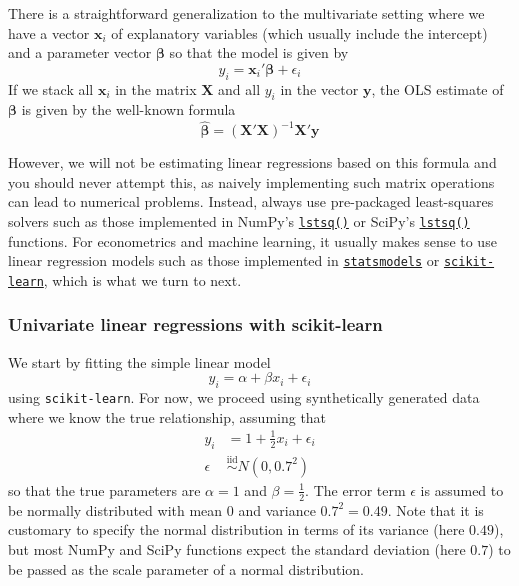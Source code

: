 \documentclass{scrartcl}
\begin{document}
There is a straightforward generalization to the multivariate setting
where we have a vector \(\mathbf{x}_i\) of explanatory variables (which
usually include the intercept) and a parameter vector \(\bm\beta\) so
that the model is given by \[
y_i = \mathbf{x}_i'\bm\beta + \epsilon_i
\] If we stack all \(\mathbf{x}_i\) in the matrix \(\mathbf{X}\) and all
\(y_i\) in the vector \(\mathbf{y}\), the OLS estimate of \(\bm\beta\)
is given by the well-known formula \[
\widehat{\bm\beta} = \left(\mathbf{X}'\mathbf{X}\right)^{-1} \mathbf{X}'\mathbf{y}
\]

However, we will not be estimating linear regressions based on this
formula and you should never attempt this, as naively implementing such
matrix operations can lead to numerical problems. Instead, always use
pre-packaged least-squares solvers such as those implemented in NumPy's
\href{https://numpy.org/doc/stable/reference/generated/numpy.linalg.lstsq.html}{\texttt{lstsq()}}
or SciPy's
\href{https://docs.scipy.org/doc/scipy/reference/generated/scipy.linalg.lstsq.html}{\texttt{lstsq()}}
functions. For econometrics and machine learning, it usually makes sense
to use linear regression models such as those implemented in
\href{https://www.statsmodels.org/stable/regression.html}{\texttt{statsmodels}}
or
\href{https://scikit-learn.org/stable/modules/generated/sklearn.linear_model.LinearRegression.html}{\texttt{scikit-learn}},
which is what we turn to next.

    \hypertarget{univariate-linear-regressions-with-scikit-learn}{%
\subsubsection{Univariate linear regressions with
scikit-learn}\label{univariate-linear-regressions-with-scikit-learn}}

We start by fitting the simple linear model \[
y_i = \alpha + \beta x_i + \epsilon_i
\] using \texttt{scikit-learn}. For now, we proceed using synthetically
generated data where we know the true relationship, assuming that \[
\begin{aligned}
y_i &= 1 + \frac{1}{2} x_i + \epsilon_i \\
\epsilon &\stackrel{\text{iid}}{\sim} N(0, 0.7^2)
\end{aligned}
\] so that the true parameters are \(\alpha = 1\) and
\(\beta = \frac{1}{2}\). The error term \(\epsilon\) is assumed to be
normally distributed with mean \(0\) and variance \(0.7^2 = 0.49\). Note
that it is customary to specify the normal distribution in terms of its
variance (here \(0.49\)), but most NumPy and SciPy functions expect the
standard deviation (here \(0.7\)) to be passed as the scale parameter of
a normal distribution.
\end{document}
